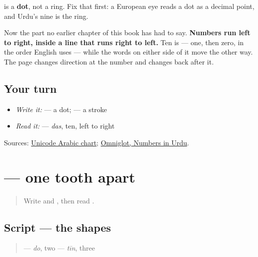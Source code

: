 \textbf{} is a \textbf{dot}, not a ring. Fix that first: a European eye reads a dot as a decimal point, and Urdu's nine is the ring.

Now the part no earlier chapter of this book has had to say. \textbf{Numbers run left to right, inside a line that runs right to left.} Ten is \textbf{} — one, then zero, in the order English uses — while the words on either side of it move the other way. The page changes direction at the number and changes back after it.

\subsection*{Your turn}
\begin{itemize}
\raggedright
  \item \emph{Write it:} \textbf{} — a dot; \textbf{} — a stroke
  \item \emph{Read it:} \textbf{} — \emph{das}, ten, left to right
\end{itemize}

\begin{tcolorbox}[breakable,colback=teal!4,colframe=teal!35!black,title={Before you move on}]
Sources: \href{https://www.unicode.org/charts/PDF/U0600.pdf}{Unicode Arabic chart}; \href{https://www.omniglot.com/language/numbers/urdu.htm}{Omniglot, Numbers in Urdu}.
\end{tcolorbox}
\section[\texorpdfstring{\ur{۲} \ur{۳} (do tīn)}{۲ ۳ (do tīn)}]{  — one tooth apart}

\label{lesson:UR-W31-digits-two-three}



\begin{quote}
Write \textbf{} and \textbf{}, then read \textbf{}.
\end{quote}

\subsection*{Script — the shapes}

\begin{quote}
\textbf{} — \emph{do}, two  \textbf{} — \emph{tīn}, three
\end{quote}

